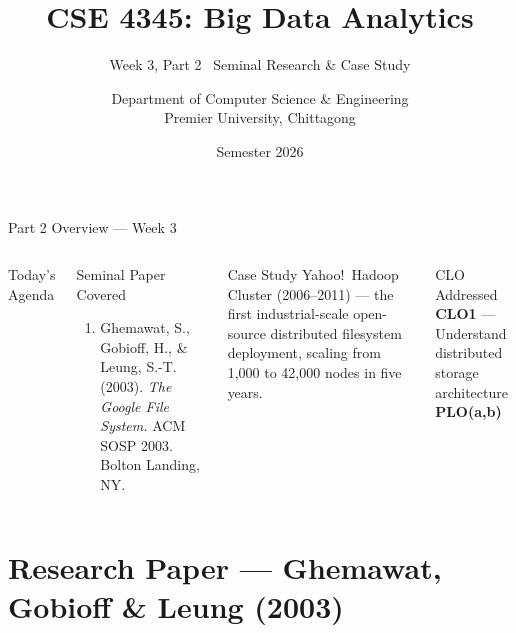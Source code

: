 \documentclass[aspectratio=169,10pt]{beamer}
\title[CSE 4345 \textbar{} Week 3, Part 2]{CSE 4345: Big Data Analytics}
\subtitle{Week 3, Part 2 \textemdash\ Seminal Research \& Case Study}
\author[Dept.\ of CSE]{Department of Computer Science \& Engineering\\[4pt]
       \small Premier University, Chittagong}
\institute{}
\date{Semester 2026}
\begin{document}

\begin{frame}
  \titlepage
\end{frame}

\begin{frame}{Part 2 Overview — Week 3}
  \begin{columns}[T]
      \begin{block}{Today's Agenda}
        \tableofcontents
      \end{block}

      \begin{exampleblock}{Seminal Paper Covered}
        \begin{enumerate}
          \item Ghemawat, S., Gobioff, H., \& Leung, S.-T. (2003).
                \textit{The Google File System.}
                ACM SOSP 2003. Bolton Landing, NY.
        \end{enumerate}
      \end{exampleblock}
      \vspace{6pt}
      \begin{alertblock}{Case Study}
        Yahoo!\ Hadoop Cluster (2006--2011) — the first industrial-scale
        open-source distributed filesystem deployment,
        scaling from 1{,}000 to 42{,}000 nodes in five years.
      \end{alertblock}
      \vspace{4pt}
      \begin{block}{CLO Addressed}
        \textbf{CLO1} — Understand distributed storage architecture\\
        \textbf{PLO(a,b)}
      \end{block}
  \end{columns}
\end{frame}

\section{Research Paper — Ghemawat, Gobioff \& Leung (2003)}
\end{document}
